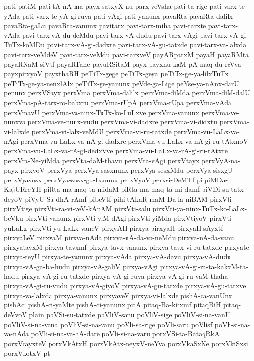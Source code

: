 {pati
patiM
pati-tA-nA-ma-payx-satxyX-nu-parx-veVsha
pati-ta-rige
pati-varx-te-yAda
pati-varx-te-yA-gi-ruva
pati-yAgi
pati-yanunx
pavaRta
pavaRta-dalilx
pavaRta-gaLu
pavaRta-vanunx
pavitarx
pavi-tarx-miha
pavi-tarxte
pavi-tarx-vAda
pavi-tarx-vA-du-deMdu
pavi-tarx-vA-dudu
pavi-tarx-vAgi
pavi-tarx-vA-gi-TuTx-koMDu
pavi-tarx-vA-gi-dadxre
pavi-tarx-vA-gu-tatxde
pavi-tarx-va-lalxda
pavi-tarx-veMdeV
pavi-tarx-veMdu
pavi-tarxveV
payARpatxM
payaH
payaRMta
payaRNaM-siVtf
payaRTane
payuRSitaM
payx
payxnu-kaM-pA-maq-du-reVva
payxpirxyoV
payxthaRH
peTiTx-gege
peTiTx-geya
peTiTx-ge-ya-lilxTuTx
peTiTx-ge-ya-nenxlAlx
peTiTx-ge-yanunx
peVde-ga-Lige
peYse-ya-nAnx-darU
penunx
perxVSayx
perxVma
perxVma-dalilx
perxVma-diMda
perxVma-diM-dalU
perxVma-pA-tarx-ro-babxru
perxVma-rUpA
perxVma-rUpa
perxVma-vAda
perxVmavU
perxVma-va-ninx-TuTx-ko-LuLxve
perxVma-vanunx
perxVma-ve-nunxva
perxVma-ve-nunx-vudu
perxVma-vi-dadxre
perxVma-vi-didxtu
perxVma-vi-lalxde
perxVma-vi-lalx-veMdU
perxVma-vi-ru-tatxde
perxVma-vu-LaLx-va-nAgi
perxVma-vu-LaLx-va-nA-gi-dadxre
perxVma-vu-LaLx-va-nA-gi-ru-tAtxnoV
perxVma-vu-LaLx-va-rA-gi-dedxVve
perxVma-vu-LaLx-va-rA-gi-ru-tAtxre
perxVra-Ne-yiMda
perxVta-daM-thavu
perxVta-vAgi
perxVtayx
perxVyA-na-payx-pirxyoV
perxVya
perxVya-sasxnunx
perxVya-sesxMdu
perxVya-sisxgU
perxVyasusx
perxVya-susx-ga-Lanunx
perxVyoV
perxsi-DeMTf
pi
piMDa-KajURreYH
piRta-ma-maq-ta-midaM
piRta-ma-maq-ta-mi-damf
piVDi-su-tatx-deyoV
piVyU-Sa-dhA-rAmf
pibeVtf
pihi-tAkaR-maM-Da-la-niBAM
pirxVti
pirxVtige
pirxVti-ra-vi-veV-kAnAM
pirxVti-salu
pirxVti-ya-ninx-TuTx-ko-LaLx-beVku
pirxVti-yanunx
pirxVti-yiM-dAgi
pirxVti-yiMda
pirxVtiyoV
pirxVti-yuLaLx
pirxVti-yu-LaLx-vaneV
pirxyAH
pirxya
pirxyaH
pirxyaH-sAyxtf
pirxyaLeV
pirxyaM
pirxya-nAda
pirxya-nA-da-va-neMdu
pirxya-nA-da-vanu
pirxyatavxM
pirxya-tavxmf
pirxya-tavx-vanunx
pirxya-tavx-vi-ru-tatxde
pirxyate
pirxya-teyU
pirxya-te-yanunx
pirxya-vAda
pirxya-vA-davu
pirxya-vA-dudu
pirxya-vA-ga-ba-hudu
pirxya-vA-galiV
pirxya-vAgi
pirxya-vA-gi-ra-ta-kakxM-ta-hadu
pirxya-vA-gi-ru-tatxde
pirxya-vA-gi-ruva
pirxya-vA-gi-ru-vaM-thaha
pirxya-vA-gi-ru-vudu
pirxya-vA-giyoV
pirxya-vA-gu-tatxde
pirxya-vA-gu-tatxve
pirxya-va-lalxda
pirxya-vanunx
pirxyaveV
pirxya-vi-lalxde
pishA-ca-vanUnx
pishAci
pishA-ci-yaMte
pishA-ci-yanunx
pitA
pitaq-Ba-kitxmf
pitaqBiH
pitaq-deVvoV
plain
poVSi-su-tatxde
poVliV-sanu
poVliV-sige
poVliV-si-na-vanU
poVliV-si-na-vana
poVliV-si-na-vanu
poVli-sa-rige
poVli-saru
poVlisf
poVli-si-na-va-nAda
poVli-si-na-va-nA-dare
poVli-si-na-varu
porxVSi-ta-BataqRkA
porxVcayxteV
porxVkAtxH
porxVkAtx-neyxV-neYva
porxVkaSxNe
porxVkiSxsi
porxVkotxV
pt
}
